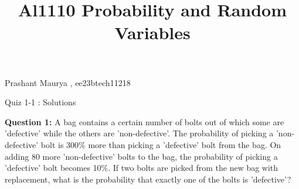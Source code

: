 \documentclass[10pt]{article}
\title{Al1110 Probability and Random Variables }
\author{}
\date{}
\begin{document}
\maketitle
Prashant Maurya , ee23btech11218

Quiz 1-1 : Solutions

\renewcommand{\thefigure}{\arabic{figure}}
\renewcommand{\thetable}{\arabic{table}}

%




%
\textbf{Question 1:}
A bag contains a certain number of bolts out of which some are 'defective' while the others are 'non-defective'. The probability of picking a 'non-defective' bolt is 300$\%$ more than picking a 'defective' bolt from the bag. On adding 80 more 'non-defective' bolts to the bag, the probability of picking a 'defective' bolt becomes 10$\%$. If two bolts are picked from the new bag with replacement, what is the probability that exactly one of the bolts is 'defective'?\\
\end{document}
